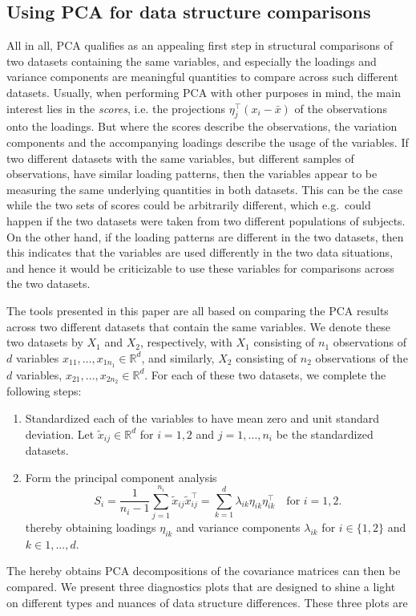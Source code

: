 \documentclass[titlepage,11pt,twoside]{article}
\newcommand{\RR}{\mathbb{R}}
\begin{document}
\subsection{Using PCA for data structure comparisons}
All in all, PCA qualifies as an appealing first step in structural comparisons of two datasets containing the same variables, and especially the loadings and variance components are meaningful quantities to compare across such different datasets. Usually, when performing PCA with other purposes in mind, the main interest lies in the \textit{scores}, i.e. the projections $\eta_j^\top (x_i - \bar{x})$ of the observations onto the loadings. But where the scores describe the observations, the variation components and the accompanying loadings describe the usage of the variables. If two different datasets with the same variables, but different samples of observations, have similar loading patterns, then the variables appear to be measuring the same underlying quantities in both datasets. This can be the case while the two sets of scores could be arbitrarily different, which e.g.\ could happen if the two datasets were taken from two different populations of subjects. On the other hand, if the loading patterns are different in the two datasets, then this indicates that the variables are used differently in the two data situations, and hence it would be criticizable to use these variables for comparisons across the two datasets.

The tools presented in this paper are all based on comparing the PCA results across two different datasets that contain the same variables. We denote these two datasets by $X_1$ and $X_2$, respectively, with $X_1$ consisting of $n_1$ observations of $d$ variables $x_{11},\dotsc,x_{1 n_1} \in \RR^d$, and similarly, $X_2$ consisting of $n_2$ observations of the $d$ variables, $x_{21},\dotsc,x_{2 n_2} \in \RR^d$. For each of these two datasets, we complete the following steps:
\begin{enumerate}
\item Standardized each of the variables to have mean zero and unit standard deviation. Let $\tilde{x}_{ij} \in \RR^d$ for $i=1,2$ and $j=1,\dotsc,n_i$ be the standardized datasets. 
\item Form the principal component analysis
\begin{equation*}
S_i = \frac{1}{n_i-1} \sum_{j=1}^{n_i} \tilde{x}_{ij} \tilde{x}_{ij}^\top = \sum_{k=1}^d \lambda_{ik} \eta_{ik} \eta_{ik}^\top \quad \text{for $i=1,2$.}
\end{equation*}
thereby obtaining loadings $\eta_{ik}$ and variance components $\lambda_{ik}$ for $i \in \{1, 2\}$ and $k \in 1, ..., d$.
\end{enumerate}
The hereby obtains PCA decompositions of the covariance matrices can then be compared. We present three diagnostics plots that are designed to shine a light on different types and nuances of data structure differences. These three plots are
\end{document}

